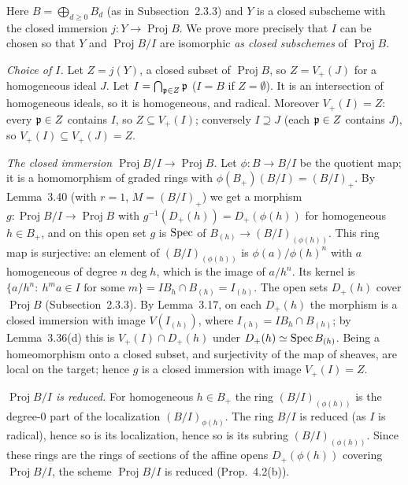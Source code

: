 \documentclass[11pt]{article}
\begin{document}
\pf
Here $B=\bigoplus_{d\ge0}B_d$ (as in Subsection~2.3.3) and $Y$ is a closed subscheme with the closed immersion $j:Y\to\operatorname{Proj}B$. We prove more precisely that $I$ can be chosen so that $Y$ and $\operatorname{Proj}B/I$ are isomorphic \emph{as closed subschemes} of $\operatorname{Proj}B$.

\emph{Choice of $I$.} Let $Z=j(Y)$, a closed subset of $\operatorname{Proj}B$, so $Z=V_+(J)$ for a homogeneous ideal $J$. Let $I=\bigcap_{\mathfrak p\in Z}\mathfrak p$ ($I=B$ if $Z=\emptyset$). It is an intersection of homogeneous ideals, so it is homogeneous, and radical. Moreover $V_+(I)=Z$: every $\mathfrak p\in Z$ contains $I$, so $Z\subseteq V_+(I)$; conversely $I\supseteq J$ (each $\mathfrak p\in Z$ contains $J$), so $V_+(I)\subseteq V_+(J)=Z$.

\emph{The closed immersion $\operatorname{Proj}B/I\to\operatorname{Proj}B$.} Let $\phi:B\to B/I$ be the quotient map; it is a homomorphism of graded rings with $\phi(B_+)(B/I)=(B/I)_+$. By Lemma~3.40 (with $r=1$, $M=(B/I)_+$) we get a morphism $g:\operatorname{Proj}B/I\to\operatorname{Proj}B$ with $g^{-1}(D_+(h))=D_+(\phi(h))$ for homogeneous $h\in B_+$, and on this open set $g$ is $\operatorname{Spec}$ of $B_{(h)}\to(B/I)_{(\phi(h))}$. This ring map is surjective: an element of $(B/I)_{(\phi(h))}$ is $\phi(a)/\phi(h)^n$ with $a$ homogeneous of degree $n\deg h$, which is the image of $a/h^n$. Its kernel is $\{a/h^n:\ h^ma\in I\text{ for some }m\}=IB_h\cap B_{(h)}=I_{(h)}$. The open sets $D_+(h)$ cover $\operatorname{Proj}B$ (Subsection~2.3.3). By Lemma~3.17, on each $D_+(h)$ the morphism is a closed immersion with image $V(I_{(h)})$, where $I_{(h)}=IB_h\cap B_{(h)}$; by Lemma~3.36(d) this is $V_+(I)\cap D_+(h)$ under $D_+(h)\simeq\operatorname{Spec} B_{(h)}$. Being a homeomorphism onto a closed subset, and surjectivity of the map of sheaves, are local on the target; hence $g$ is a closed immersion with image $V_+(I)=Z$.

\emph{$\operatorname{Proj}B/I$ is reduced.} For homogeneous $h\in B_+$ the ring $(B/I)_{(\phi(h))}$ is the degree-$0$ part of the localization $(B/I)_{\phi(h)}$. The ring $B/I$ is reduced (as $I$ is radical), hence so is its localization, hence so is its subring $(B/I)_{(\phi(h))}$. Since these rings are the rings of sections of the affine opens $D_+(\phi(h))$ covering $\operatorname{Proj}B/I$, the scheme $\operatorname{Proj}B/I$ is reduced (Prop.~4.2(b)).
\end{document}
